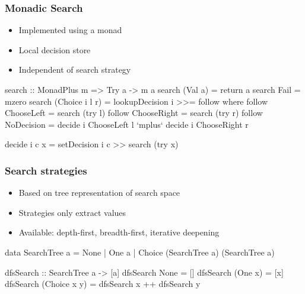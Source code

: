 \documentclass[
,hyperref={pdfpagelabels=false}
]{beamer}
\begin{document}
\begin{frame}[fragile]%
\frametitle{Monadic Search}

\begin{itemize}
  \item Implemented using a  monad
  \item Local decision store
  \item Independent of search strategy
\end{itemize}

\begin{haskell}
search :: MonadPlus m => Try a -> m a
search (Val a)        = return a
search Fail           = mzero
search (Choice i l r) = lookupDecision i >>= follow
  where
  follow ChooseLeft  = search (try l)
  follow ChooseRight = search (try r)
  follow NoDecision  = decide i ChooseLeft  l
               `mplus` decide i ChooseRight r

  decide i c x = setDecision i c >> search (try x)
\end{haskell}
\end{frame}

\begin{frame}[fragile]%
\frametitle{Search strategies}
\begin{itemize}
  \item Based on tree representation of search space
  \item Strategies only extract values
  \item Available: depth-first, breadth-first, iterative deepening
\end{itemize}

\begin{haskell}[SearchTree]
data SearchTree a = None
                  | One a
                  | Choice (SearchTree a) (SearchTree a)
\end{haskell}

\begin{haskell}
dfsSearch :: SearchTree a -> [a]
dfsSearch None         = []
dfsSearch (One      x) = [x]
dfsSearch (Choice x y) = dfsSearch x ++ dfsSearch y
\end{haskell}
\end{frame}
\end{document}
